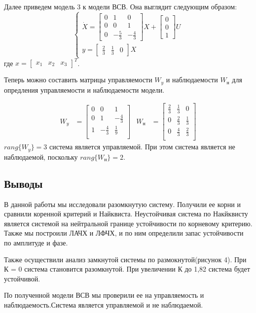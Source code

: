 \documentclass[a4paper, 12pt]{article}
\begin{document}
Далее приведем модель 3 к модели ВСВ. Она выглядит следующим образом:
\begin{equation}
\begin{cases}
\dot{X} = \begin{bmatrix}
0 & 1 & 0 \\
0 & 0 & 1 \\
0 & -\frac{5}{3} & -\frac{4}{3}
\end{bmatrix}X + \begin{bmatrix}
0 \\ 0 \\ 1
\end{bmatrix}U \\
y = \begin{bmatrix}\frac{2}{3} & \frac{1}{3} & 0\end{bmatrix} X
\end{cases}
\end{equation}
где $x = \begin{bmatrix} x_1 & x_2 & x_3 \end{bmatrix}^T$.
\newpage
\par
Теперь можно составить матрицы управляемости $W_y$ и наблюдаемости $W_\text{н}$ для опредления управляемости и наблюдаемости модели.

\begin{align*}
W_y & = \begin{bmatrix}
0 & 0 & 1 \\
0 & 1 & -\frac{4}{3} \\
1 & -\frac{4}{3} & \frac{1}{9} \\
\end{bmatrix} & 
W_\text{н} & = \begin{bmatrix}
\frac{2}{3} & \frac{1}{3} & 0 \\
0 & \frac{2}{3} & \frac{1}{3} \\
0 & \frac{4}{3} & \frac{2}{3} \\
\end{bmatrix}
\end{align*}
 $rang\{W_y\} = 3$ система является управляемой. При этом система является не наблюдаемой, поскольку $rang\{W_\text{н}\} = 2$.

\newpage
\begin{center}
	\section*{Выводы}
\end{center}

В данной работы мы исследовали разомкнутую систему. Получили ее корни и сравнили коренной критерий и Найквиста. Неустойчивая система по Накйквисту является системой на нейтральной границе устойчивости по корневому критерию. Также мы построили ЛАЧХ и ЛФЧХ, и по ним определили запас устойчивости по амплитуде и фазе. \par
Также осуществили анализ замкнутой системы по размокнутой(рисунок 4). При К = 0 система становится разомкнутой. При увеличении К до 1,82 система будет устойчивой. \par

По полученной модели ВСВ мы проверили ее на управляемость и наблюдаемость.Система является управляемой и не наблюдаемой.
\end{document}
